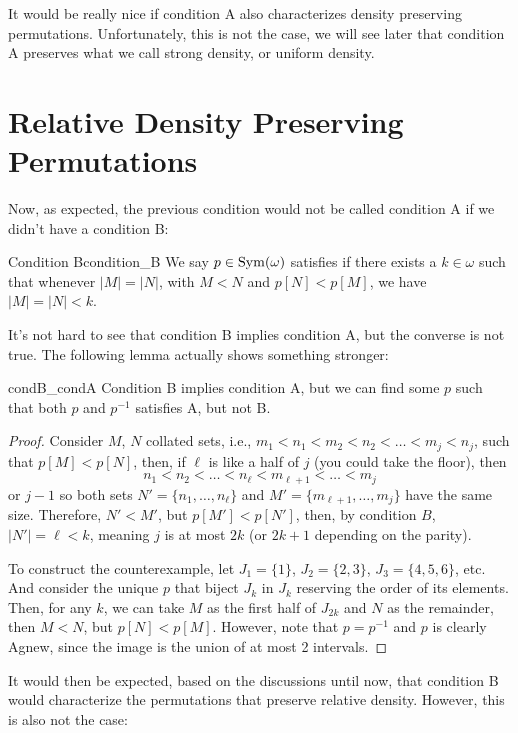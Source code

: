 It would be really nice if condition A also characterizes density preserving permutations. Unfortunately, this is not the case, we will see later that condition A preserves what we call strong density, or uniform density.

\section{Relative Density Preserving Permutations}

Now, as expected, the previous condition would not be called condition A if we didn't have a condition B:

\begin{definition}{Condition B}{condition_B}
    We say $p\in\mathrm{Sym}(\omega)$ satisfies  if there exists a $k\in\omega$ such that whenever $|M|=|N|$, with $M<N$ and $p[N]<p[M]$, we have $|M|=|N|<k$.
\end{definition}

It's not hard to see that condition B implies condition A, but the converse is not true. The following lemma actually shows something stronger:

\begin{lemma}{}{condB_condA}
    Condition B implies condition A, but we can find some $p$ such that both $p$ and $p^{-1}$ satisfies A, but not B.
\end{lemma}

\begin{proof}
    Consider $M$, $N$ collated sets, i.e., $m_1<n_1<m_2<n_2<\dots<m_j<n_j$, such that $p[M]<p[N]$, then, if $\ell$ is like a half of $j$ (you could take the floor), then
    $$n_1<n_2<\dots<n_\ell<m_{\ell+1}<\dots<m_j$$
    or $j-1$ so both sets $N'=\{n_1,\dots,n_\ell\}$ and $M'=\{m_{\ell+1},\dots,m_j\}$ have the same size. Therefore, $N'<M'$, but $p[M']<p[N']$, then, by condition $B$, $\lvert N'\rvert=\ell<k$, meaning $j$ is at most $2k$ (or $2k+1$ depending on the parity).

    To construct the counterexample, let $J_1=\{1\}$, $J_2=\{2,3\}$, $J_3=\{4,5,6\}$, etc. And consider the unique $p$ that biject $J_k$ in $J_k$ reserving the order of its elements. Then, for any $k$, we can take $M$ as the first half of $J_{2k}$ and $N$ as the remainder, then $M<N$, but $p[N]<p[M]$. However, note that $p=p^{-1}$ and $p$ is clearly Agnew, since the image is the union of at most 2 intervals.
\end{proof}

It would then be expected, based on the discussions until now, that condition B would characterize the permutations that preserve relative density. However, this is also not the case:

